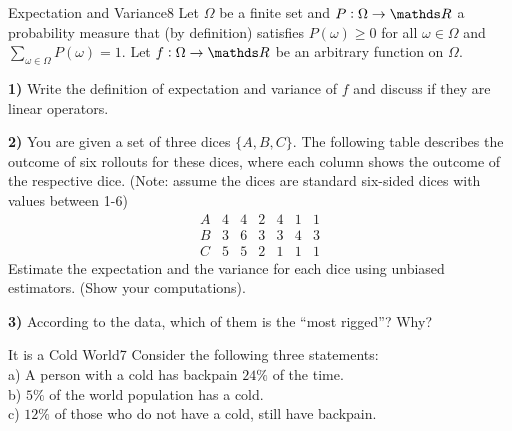 \newif\ifvimbug
\vimbugfalse

\ifvimbug

\fi

 

\begin{questions}


\begin{question}{Expectation and Variance}{8}
Let $\Omega$ be a finite set and $P:\Omega\rightarrow\R$ a probability measure that (by definition) satisfies $P(\omega)\geq0$ for all $\omega\in\Omega$ and $\sum_{\omega\in\Omega}P(\omega)=1$. 
Let $f:\Omega\rightarrow\R$ be an arbitrary function on $\Omega$.

\textbf{1)} Write the definition of expectation and variance of $f$ and discuss if they are linear operators.

\textbf{2)} You are given a set of three dices $\{A,B,C\}$.
The following table describes the outcome of six rollouts for these dices, where each column shows the outcome of the respective dice. 
(Note: assume the dices are standard six-sided dices with values between 1-6)
\begin{equation*}
\begin{array}{r|cccccc}
    A & 4 & 4 & 2 & 4 & 1 & 1 \\
    \hline
    B & 3 & 6 & 3 & 3 & 4 & 3 \\
    \hline
    C & 5 & 5 & 2 & 1 & 1 & 1 
\end{array}
\end{equation*}
Estimate the expectation and the variance for each dice using unbiased estimators. (Show your computations).

\textbf{3)} According to the data, which of them is the ``most rigged''? Why?

\begin{answer}\end{answer}

\end{question}


\begin{question}{It is a Cold World}{7}
Consider the following three statements:
\\
a) A person with a cold has backpain $24\%$ of the time.
\\
b) $5\%$ of the world population has a cold.
\\
c) $12\%$ of those who do not have a cold, still have backpain.


\end{question}
\end{questions}
